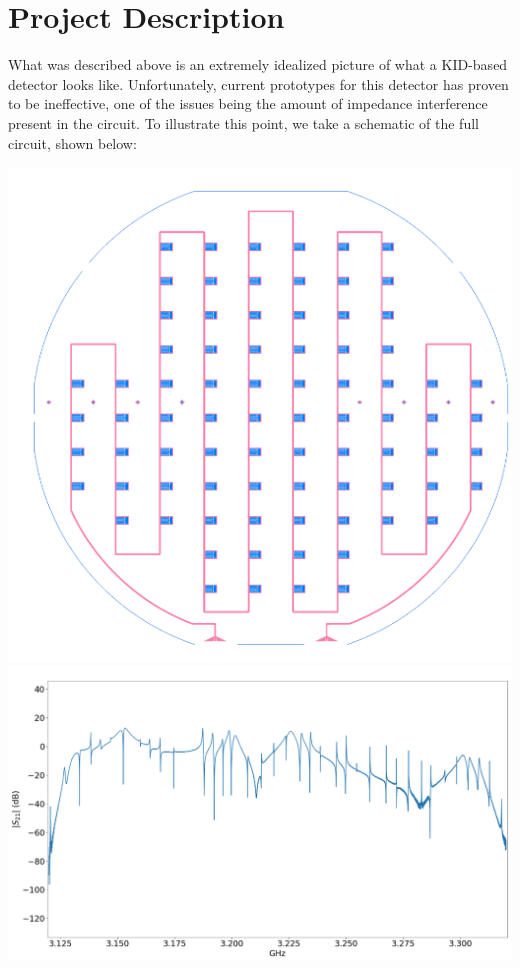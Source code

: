 \documentclass[10pt]{article}
\begin{document}
	\section{Project Description} 
	What was described above is an extremely idealized picture of what a KID-based 
	detector looks like. Unfortunately, current prototypes for this detector 
	has proven to be ineffective, one of the issues being the amount of impedance 
	interference present in the circuit. To illustrate this point, we 
	take a schematic of the full circuit, shown below:

	\begin{center}
		\includegraphics[scale=0.3]{feed_line.png}
		\includegraphics[scale=0.3]{exp.png}
	\end{center}
\end{document}
